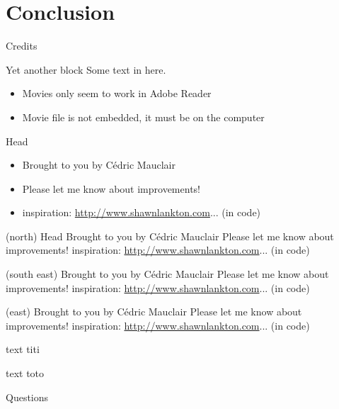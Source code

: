 \documentclass[a4paper, utf8]{beamer}
\begin{document}
\section
  {Conclusion}

\begin{frame}
  {Credits}

  \begin{alertblock}{Yet another block}
    Some text in here.
    \begin{itemize}
    \item Movies only seem to work in Adobe Reader
    \item Movie file is not embedded, it must be on the computer
    \end{itemize}
  \end{alertblock}

  \begin{beamerboxesrounded}{Head}
    \begin{itemize}
    \item Brought to you by Cédric Mauclair
    \item Please let me know about improvements!
    \item inspiration: \url{http://www.shawnlankton.com}... (in code)
    \end{itemize}
  \end{beamerboxesrounded}

  \blackout%

  \putbox%
    [anchor=north, text width=0.75\textwidth]
    (north) {Head}
    {Brought to you by Cédric Mauclair Please let me know about
     improvements! inspiration: \url{http://www.shawnlankton.com}...
     (in code)}

    (south east) {}
    {Brought to you by Cédric Mauclair Please let me know about
     improvements! inspiration: \url{http://www.shawnlankton.com}...
     (in code)}

    (east) {}
    {Brought to you by Cédric Mauclair Please let me know about
     improvements! inspiration: \url{http://www.shawnlankton.com}...
     (in code)}

   text titi

   text toto
\end{frame}

\begin{frame}
  {Questions}

  \nocite{lorem,ipsum}
  
  

\end{frame}
\end{document}
